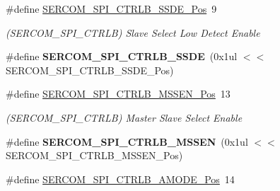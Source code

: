 \begin{DoxyCompactItemize}
\item 
\hypertarget{group___s_a_m_l21___s_e_r_c_o_m_ga2c0679bf5f5bc3c353faca2688a45ffd}{}\#define \hyperlink{group___s_a_m_l21___s_e_r_c_o_m_ga2c0679bf5f5bc3c353faca2688a45ffd}{S\+E\+R\+C\+O\+M\+\_\+\+S\+P\+I\+\_\+\+C\+T\+R\+L\+B\+\_\+\+S\+S\+D\+E\+\_\+\+Pos}~9\label{group___s_a_m_l21___s_e_r_c_o_m_ga2c0679bf5f5bc3c353faca2688a45ffd}

\begin{DoxyCompactList}\small\item\em (S\+E\+R\+C\+O\+M\+\_\+\+S\+P\+I\+\_\+\+C\+T\+R\+L\+B) Slave Select Low Detect Enable \end{DoxyCompactList}\item 
\hypertarget{group___s_a_m_l21___s_e_r_c_o_m_gae5ed76496c9e95515b6f2b48d4d7764c}{}\#define {\bfseries S\+E\+R\+C\+O\+M\+\_\+\+S\+P\+I\+\_\+\+C\+T\+R\+L\+B\+\_\+\+S\+S\+D\+E}~(0x1ul $<$$<$ S\+E\+R\+C\+O\+M\+\_\+\+S\+P\+I\+\_\+\+C\+T\+R\+L\+B\+\_\+\+S\+S\+D\+E\+\_\+\+Pos)\label{group___s_a_m_l21___s_e_r_c_o_m_gae5ed76496c9e95515b6f2b48d4d7764c}

\item 
\hypertarget{group___s_a_m_l21___s_e_r_c_o_m_gae02169992bebf70ec79f3381361ea43d}{}\#define \hyperlink{group___s_a_m_l21___s_e_r_c_o_m_gae02169992bebf70ec79f3381361ea43d}{S\+E\+R\+C\+O\+M\+\_\+\+S\+P\+I\+\_\+\+C\+T\+R\+L\+B\+\_\+\+M\+S\+S\+E\+N\+\_\+\+Pos}~13\label{group___s_a_m_l21___s_e_r_c_o_m_gae02169992bebf70ec79f3381361ea43d}

\begin{DoxyCompactList}\small\item\em (S\+E\+R\+C\+O\+M\+\_\+\+S\+P\+I\+\_\+\+C\+T\+R\+L\+B) Master Slave Select Enable \end{DoxyCompactList}\item 
\hypertarget{group___s_a_m_l21___s_e_r_c_o_m_ga7936fb2746ff3b7d9906b8ea0882d062}{}\#define {\bfseries S\+E\+R\+C\+O\+M\+\_\+\+S\+P\+I\+\_\+\+C\+T\+R\+L\+B\+\_\+\+M\+S\+S\+E\+N}~(0x1ul $<$$<$ S\+E\+R\+C\+O\+M\+\_\+\+S\+P\+I\+\_\+\+C\+T\+R\+L\+B\+\_\+\+M\+S\+S\+E\+N\+\_\+\+Pos)\label{group___s_a_m_l21___s_e_r_c_o_m_ga7936fb2746ff3b7d9906b8ea0882d062}

\item 
\hypertarget{group___s_a_m_l21___s_e_r_c_o_m_ga48799d0ce0df98d60ec4c7cbddfbabe9}{}\#define \hyperlink{group___s_a_m_l21___s_e_r_c_o_m_ga48799d0ce0df98d60ec4c7cbddfbabe9}{S\+E\+R\+C\+O\+M\+\_\+\+S\+P\+I\+\_\+\+C\+T\+R\+L\+B\+\_\+\+A\+M\+O\+D\+E\+\_\+\+Pos}~14\label{group___s_a_m_l21___s_e_r_c_o_m_ga48799d0ce0df98d60ec4c7cbddfbabe9}


\end{DoxyCompactItemize}
